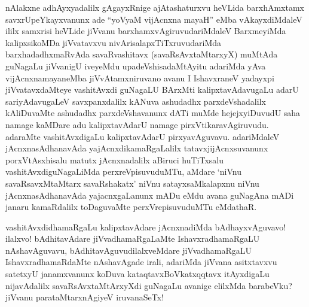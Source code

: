
\begin{artha}
nAlakxne adhAyxyadalilx gAgayxRnige ajAtashaturxvu heVLida barxhAmxtamx savxrUpeYkayxvanunx ade ``yoV\s yaM vijAcnxna mayaH'' eMba vAkayxdiMdaleV ililx samxrisi heVLide jiVvanu barxhamxvAgiruvudariMdaleV BarxmeyiMda kalipxsikoMDa jiVvatavxvu nivArisalapxTiTxruvudariMda barxhadadhxmaRvAda savaRvashitavx (savaRsAvxtaMtarxyX) muMtAda guNagaLu jiVvanigU iveyeMdu upadeVshisadaMtAyitu adariMda yAva vijAcnxnamayaneMba jiVvAtamxniruvano avanu I IshavxraneV yadayxpi jiVvatavxdaMteye vashitAvxdi guNagaLU BArxMti kalipxtavAdavugaLu adarU sariyAdavugaLeV savxpanxdalilx kANuva ashudadhx parxdeVshadalilx kAliDuvaMte ashudadhx parxdeVshavanunx dATi muMde hejejxyiDuvudU saha namage kaMDare adu kalipxtavAdarU namage pirxVtikaravAgiruvudu. adaraMte vashitAvxdigaLu kalipxtavAdarU pirxyavAguvavu. adariMdaleV jAcnxnasAdhanavAda yajAcnxdikamaRgaLalilx tatavxjijAcnxsuvanunx porxVtAsxhisalu matutx jAcnxnadalilx aBiruci huTiTxsalu vashitAvxdiguNagaLiMda perxreVpisuvuduMTu, aMdare `niVnu savaRsavxMtaMtarx savaRshakatx' niVnu satayxsaMkalapxnu niVnu jAcnxnasAdhanavAda yajacnxgaLanunx mADu eMdu avana guNagAna mADi janaru kamaRdalilx toDaguvaMte perxVrepisuvuduMTu eMdathaR.
\end{artha}


\begin{artha}
vashitAvxdidhamaRgaLu kalipxtavAdare jAcnxnadiMda bAdhayxvAguvavo! ilalxvo! bAdhitavAdare jiVvadhamaRgaLaMte IshavxradhamaRgaLU nAshavAguvavu, bAdhitavAguvudilalxveMdare jiVvadhamaRgaLU IshavxradhamaRdaMte nAshavAgade irali, adariMda jiVvana asitxtavxvu satetxyU janamxvanunx koDuva kataqtavxBoVkatxqqtavx itAyxdigaLu nijavAdalilx savaRsAvxtaMtArxyXdi guNagaLu avanige elilxMda barabeVku? jiVvanu parataMtarxnAgiyeV iruvanaSeTx!
\end{artha}

